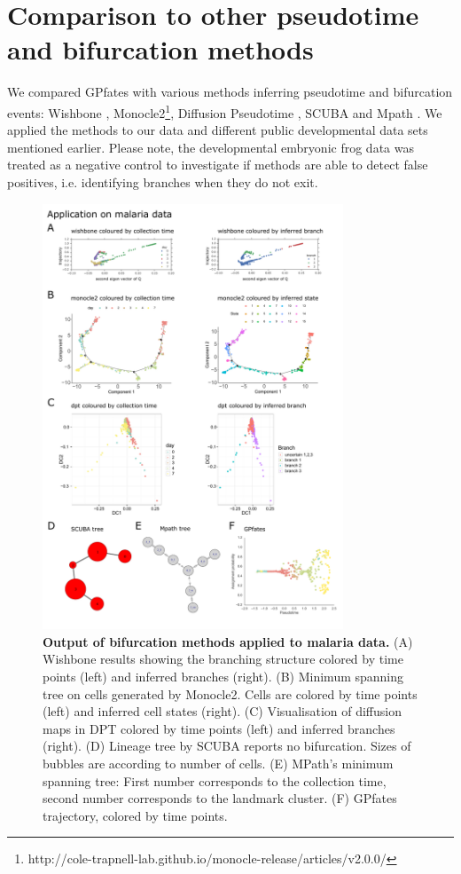 \section{Comparison to other pseudotime and bifurcation methods}

We compared GPfates with various methods inferring pseudotime and bifurcation events: Wishbone \cite{Setty2016-ie}, Monocle2\footnote{http://cole-trapnell-lab.github.io/monocle-release/articles/v2.0.0/}, Diffusion Pseudotime \cite{Haghverdi2016-tm}, SCUBA \cite{Marco2014-rf} and Mpath \cite{Chen2016-ar}. We applied the methods to our data and different public developmental data sets mentioned earlier. Please note, the developmental embryonic frog data was treated as a negative control to investigate if methods are able to detect false positives, i.e. identifying branches when they do not exit.

\begin{figure}
    \centering
    \includegraphics[width=0.8\textwidth]{"results_malaria"}
    \caption[Output of bifurcation methods applied to malaria data]{\textbf{Output of bifurcation methods applied to malaria data.} (A) Wishbone results showing the branching structure colored by time points (left) and inferred branches (right). (B) Minimum spanning tree on cells generated by Monocle2. Cells are colored by time points (left) and inferred cell states (right). (C) Visualisation of diffusion maps in DPT colored by time points (left) and inferred branches (right). (D) Lineage tree by SCUBA reports no bifurcation. Sizes of bubbles are according to number of cells. (E) MPath's minimum spanning tree: First number corresponds to the collection time, second number corresponds to the landmark cluster. (F) GPfates trajectory, colored by time points.}
    \label{fig:res_malaria}
\end{figure}

